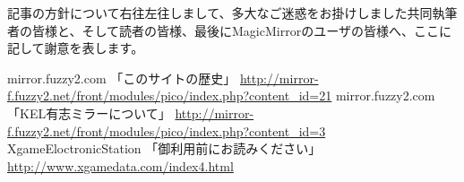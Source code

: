記事の方針について右往左往しまして、多大なご迷惑をお掛けしました共同執筆者の皆様と、そして読者の皆様、最後にMagicMirrorのユーザの皆様へ、ここに記して謝意を表します。

\begin{thebibliography}{9} 
  mirror.fuzzy2.com 「このサイトの歴史」 \url{http://mirror-f.fuzzy2.net/front/modules/pico/index.php?content_id=21}
  mirror.fuzzy2.com 「KEL有志ミラーについて」 \url{http://mirror-f.fuzzy2.net/front/modules/pico/index.php?content_id=3}
  XgameEloctronicStation 「御利用前にお読みください」 \url{http://www.xgamedata.com/index4.html}
\end{thebibliography}
